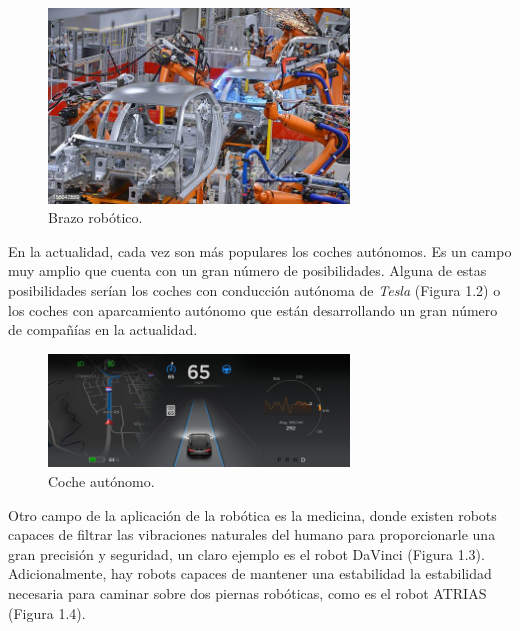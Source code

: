 \documentclass[a4paper, 12pt]{book}
\begin{document}
\begin{figure}[H]
	\centering
    \includegraphics[width=8cm, keepaspectratio]{img/brazo}
    \caption{Brazo robótico.}
    \label{figura:brazo_robotico}
\end{figure}

En la actualidad, cada vez son más populares los coches autónomos. Es un campo muy amplio que cuenta con un gran número de posibilidades. Alguna de estas posibilidades serían los coches con conducción autónoma de \textit{Tesla}  (Figura 1.2) o los coches con aparcamiento autónomo que están desarrollando un gran número de compañías en la actualidad.

\begin{figure}[H]
	\centering
    \includegraphics[width=8cm, keepaspectratio]{img/coche}
    \caption{Coche autónomo.}
    \label{figura:coche_autonomo}
\end{figure}

Otro campo de la aplicación de la robótica es la medicina, donde existen robots capaces de filtrar las vibraciones naturales del humano para proporcionarle una gran precisión y seguridad, un claro ejemplo es el robot DaVinci (Figura 1.3). Adicionalmente, hay robots capaces de mantener una estabilidad la estabilidad necesaria para caminar sobre dos piernas robóticas, como es el robot ATRIAS (Figura 1.4).
\end{document}
